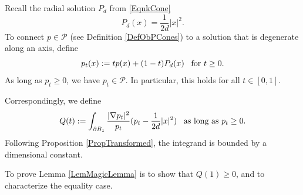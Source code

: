 \documentclass{amsart}
\def\P{\mathcal{P}}
\def\hem{\hspace{0.5em}}
\theoremstyle{definition}
\numberwithin{equation}{section}
\theoremstyle{remark}
\begin{document}
Recall the radial solution $P_d$ from \eqref{EqnkCone}
\begin{equation}\label{EqnPD}
P_d(x)=\frac{1}{2d}|x|^2.
\end{equation}
To connect  $p\in\P$ (see Definition \ref{DefObPCones}) to a solution that is degenerate along an axis, define
\begin{equation}
\label{EqnInterpolation}
p_t(x):=tp(x)+(1-t)P_d(x)\hem \text{ for }t\ge0.
\end{equation} 
As long as $p_t\ge0$, we have 
$
p_t\in\P.
$
In particular, this holds for all $t\in[0,1].$

Correspondingly, we define
\begin{equation}
\label{EqnQInterpolation}
Q(t):=\int_{\partial B_1}\frac{|\nabla p_t|^2}{p_t}(p_t-\frac{1}{2d}|x|^2) \hem\text{ as long as }p_t\ge0. 
\end{equation} 
Following Proposition \ref{PropTransformed}, the integrand is bounded by a dimensional constant.

To prove Lemma \ref{LemMagicLemma} is to show that $Q(1)\ge0$, and to characterize the equality case. 
\end{document}
